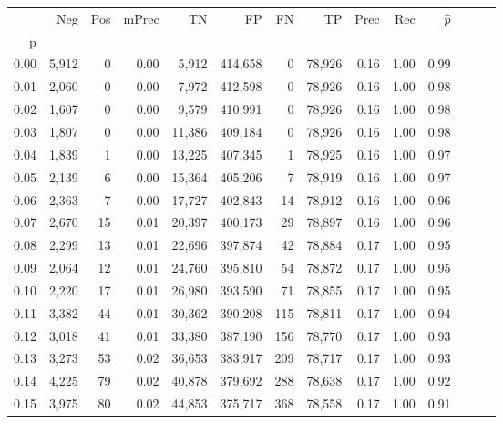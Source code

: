 \begin{tabular}{rrrrrrrrrrrrrr}
\toprule
{} &    Neg &    Pos & mPrec &       TN &       FP &      FN &      TP &  Prec &   Rec & $\hat{p}$ \\
p    &        &        &       &          &          &         &         &       &       &           \\
\midrule
0.00 &  5,912 &      0 &  0.00 &    5,912 &  414,658 &       0 &  78,926 &  0.16 &  1.00 &      0.99 \\
0.01 &  2,060 &      0 &  0.00 &    7,972 &  412,598 &       0 &  78,926 &  0.16 &  1.00 &      0.98 \\
0.02 &  1,607 &      0 &  0.00 &    9,579 &  410,991 &       0 &  78,926 &  0.16 &  1.00 &      0.98 \\
0.03 &  1,807 &      0 &  0.00 &   11,386 &  409,184 &       0 &  78,926 &  0.16 &  1.00 &      0.98 \\
0.04 &  1,839 &      1 &  0.00 &   13,225 &  407,345 &       1 &  78,925 &  0.16 &  1.00 &      0.97 \\
0.05 &  2,139 &      6 &  0.00 &   15,364 &  405,206 &       7 &  78,919 &  0.16 &  1.00 &      0.97 \\
0.06 &  2,363 &      7 &  0.00 &   17,727 &  402,843 &      14 &  78,912 &  0.16 &  1.00 &      0.96 \\
0.07 &  2,670 &     15 &  0.01 &   20,397 &  400,173 &      29 &  78,897 &  0.16 &  1.00 &      0.96 \\
0.08 &  2,299 &     13 &  0.01 &   22,696 &  397,874 &      42 &  78,884 &  0.17 &  1.00 &      0.95 \\
0.09 &  2,064 &     12 &  0.01 &   24,760 &  395,810 &      54 &  78,872 &  0.17 &  1.00 &      0.95 \\
0.10 &  2,220 &     17 &  0.01 &   26,980 &  393,590 &      71 &  78,855 &  0.17 &  1.00 &      0.95 \\
0.11 &  3,382 &     44 &  0.01 &   30,362 &  390,208 &     115 &  78,811 &  0.17 &  1.00 &      0.94 \\
0.12 &  3,018 &     41 &  0.01 &   33,380 &  387,190 &     156 &  78,770 &  0.17 &  1.00 &      0.93 \\
0.13 &  3,273 &     53 &  0.02 &   36,653 &  383,917 &     209 &  78,717 &  0.17 &  1.00 &      0.93 \\
0.14 &  4,225 &     79 &  0.02 &   40,878 &  379,692 &     288 &  78,638 &  0.17 &  1.00 &      0.92 \\
0.15 &  3,975 &     80 &  0.02 &   44,853 &  375,717 &     368 &  78,558 &  0.17 &  1.00 &      0.91 \\

\end{tabular}
